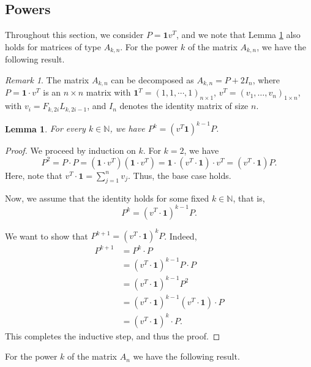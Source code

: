 \documentclass[11pt]{birkjour}
\newtheorem{lem}[thm]{Lemma}
\theoremstyle{definition}
\theoremstyle{remark}
\newtheorem{rem}[thm]{Remark}
\numberwithin{equation}{section}
\begin{document}
\subsection{Powers}\label{powersgen}

Throughout this section, we consider $P=\mathbf{1}v^{T}$, and we note that Lemma \ref{P} also holds for matrices of type $A_{k,n}$. For the power $k$ of the matrix $A_{k,n}$, we have the following result.

\begin{rem}\label{decomp}
The matrix $A_{k,n}$ can be decomposed as $A_{k,n}= P+2I_n$, where $P=\mathbf{1}\cdot v^{T}$ is an $n\times n$ matrix with $\mathbf{1}^{T}=(1,1,\cdots,1)_{n\times1}$, $v^{T}=(v_1,\ldots,v_n)_{1\times n}$, with $v_i=F_{k,2i}L_{k,2i-1}$, and $I_n$ denotes the identity matrix of size $n$.
\end{rem}

\begin{lem}\label{P}
For every $k\in \mathbb{N}$, we have $P^k=(v^{T}\mathbf{1})^{k-1}P$.
\end{lem}

\begin{proof}
We proceed by induction on $k$. For $k=2$, we have
\[
P^2=P\cdot P=(\mathbf{1}\cdot v^{T})(\mathbf{1}\cdot v^{T})
= \mathbf{1}\cdot (v^{T}\cdot\mathbf{1})\cdot v^{T}
=(v^{T}\cdot\mathbf{1})P.
\]
Here, note that $v^{T}\cdot\mathbf{1}=\displaystyle \sum_{j=1}^{n}v_{j}$. Thus, the base case holds.
\par\bigskip

\noindent Now, we assume that the identity holds for some fixed $k\in \mathbb{N}$, that is,
\[
P^{k}=(v^{T}\cdot \mathbf{1})^{k-1}P.
\]

\noindent We want to show that $P^{k+1}=(v^{T}\cdot \mathbf{1})^{k}P$. Indeed,
\begin{align*}
    P^{k+1} &= P^{k}\cdot P \\
    &= (v^{T}\cdot \mathbf{1})^{k-1}P\cdot P \\
    &= (v^{T}\cdot \mathbf{1})^{k-1}P^2 \\
    &= (v^{T}\cdot \mathbf{1})^{k-1} (v^{T}\cdot \mathbf{1})\cdot P \\
    &= (v^{T}\cdot \mathbf{1})^{k}\cdot P.
\end{align*}
This completes the inductive step, and thus the proof.
\end{proof}


\noindent For the power $k$ of the matrix $A_n$ we have the following result.
\end{document}

